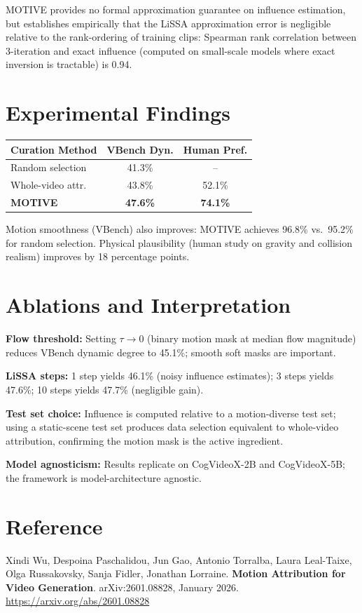\documentclass[10pt,twocolumn]{article}
\begin{document}
MOTIVE provides no formal approximation guarantee on influence estimation,
but establishes empirically that the LiSSA approximation error is negligible
relative to the rank-ordering of training clips: Spearman rank correlation
between 3-iteration and exact influence (computed on small-scale models
where exact inversion is tractable) is 0.94.

\section{Experimental Findings}

\begin{center}
\small
\begin{tabular}{lcc}
\toprule
\textbf{Curation Method} & \textbf{VBench Dyn.} & \textbf{Human Pref.} \\
\midrule
Random selection   & 41.3\% & -- \\
Whole-video attr.  & 43.8\% & 52.1\% \\
\textbf{MOTIVE}    & \textbf{47.6\%} & \textbf{74.1\%} \\
\bottomrule
\end{tabular}
\end{center}

Motion smoothness (VBench) also improves: MOTIVE achieves 96.8\%
vs.\ 95.2\% for random selection. Physical plausibility (human study
on gravity and collision realism) improves by 18 percentage points.

\section{Ablations and Interpretation}

\textbf{Flow threshold:} Setting $\tau \to 0$ (binary motion mask at median
flow magnitude) reduces VBench dynamic degree to 45.1\%; smooth soft masks
are important.

\textbf{LiSSA steps:} 1 step yields 46.1\% (noisy influence estimates);
3 steps yields 47.6\%; 10 steps yields 47.7\% (negligible gain).

\textbf{Test set choice:} Influence is computed relative to a motion-diverse
test set; using a static-scene test set produces data selection equivalent
to whole-video attribution, confirming the motion mask is the active ingredient.

\textbf{Model agnosticism:} Results replicate on CogVideoX-2B and CogVideoX-5B;
the framework is model-architecture agnostic.

\section*{Reference}

Xindi Wu, Despoina Paschalidou, Jun Gao, Antonio Torralba, Laura Leal-Taixe,
Olga Russakovsky, Sanja Fidler, Jonathan Lorraine.
\textbf{Motion Attribution for Video Generation}.
arXiv:2601.08828, January 2026.
\url{https://arxiv.org/abs/2601.08828}
\end{document}
